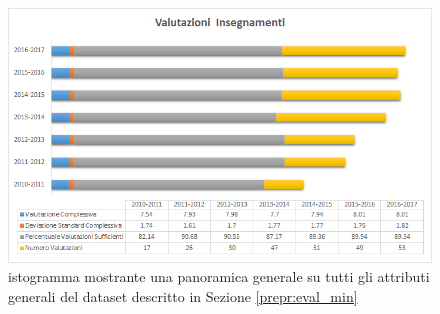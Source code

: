     \begin{figure}
        \centering
        \caption{istogramma mostrante una panoramica generale su tutti gli attributi generali del dataset descritto in Sezione \ref{prepr:eval_min}}
        \label{eval_gen}
        \includegraphics[scale=0.55]{../visual/eval_3.png}
    \end{figure}